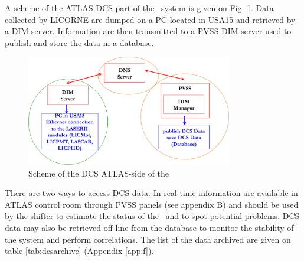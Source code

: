 A scheme of the ATLAS-DCS part of the \las~system is given on Fig. \ref{fig:lasdcs}. Data collected by LICORNE are dumped on a PC located in USA15 and retrieved by a DIM server. Information are then transmitted to a PVSS DIM server used to publish and store the data in a database.

\begin{figure}[htbp]
\centering
\includegraphics[width=9cm]{figures/dcs_scheme.png}
\caption{Scheme of the DCS ATLAS-side of the \las}\label{fig:lasdcs}
\end{figure}

There are two ways to access DCS data. In real-time information are available in ATLAS control room through PVSS panels (see appendix B) and should be used by the shifter to estimate the status of the \laser~and to spot potential problems. DCS data may also be retrieved off-line from the database to monitor the stability of the system and perform correlations. The list of the data archived are given on table \ref{tab:dcsarchive} (Appendix \ref{app:f}).